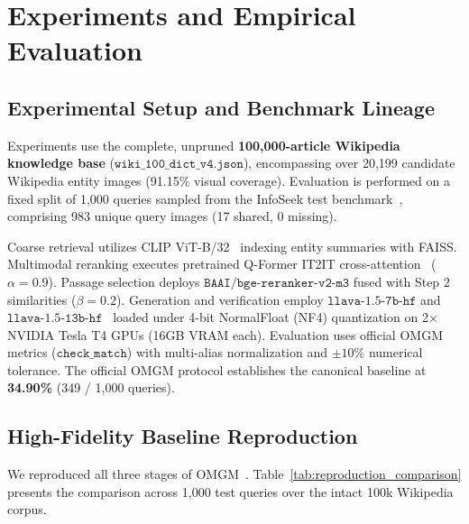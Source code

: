 \documentclass[conference]{IEEEtran}
\begin{document}
\section{Experiments and Empirical Evaluation}

\subsection{Experimental Setup and Benchmark Lineage}
Experiments use the complete, unpruned \textbf{100,000-article Wikipedia knowledge base} ($\mathtt{wiki\_100\_dict\_v4.json}$), encompassing over 20,199 candidate Wikipedia entity images (91.15\% visual coverage). Evaluation is performed on a fixed split of 1,000 queries sampled from the InfoSeek test benchmark~\cite{infoseek}, comprising 983 unique query images (17 shared, 0 missing).

Coarse retrieval utilizes CLIP ViT-B/32~\cite{clip} indexing entity summaries with FAISS. Multimodal reranking executes pretrained Q-Former IT2IT cross-attention~\cite{blip2, omgm2025} ($\alpha = 0.9$). Passage selection deploys $\mathtt{BAAI/bge\text{-}reranker\text{-}v2\text{-}m3}$ fused with Step 2 similarities ($\beta = 0.2$). Generation and verification employ $\mathtt{llava\text{-}1.5\text{-}7b\text{-}hf}$ and $\mathtt{llava\text{-}1.5\text{-}13b\text{-}hf}$~\cite{llava15} loaded under 4-bit NormalFloat (NF4) quantization on 2$\times$ NVIDIA Tesla T4 GPUs (16GB VRAM each). Evaluation uses official OMGM metrics ($\mathtt{check\_match}$) with multi-alias normalization and $\pm 10\%$ numerical tolerance. The official OMGM protocol establishes the canonical baseline at \textbf{34.90\%} (349 / 1,000 queries).

\subsection{High-Fidelity Baseline Reproduction}
We reproduced all three stages of OMGM~\cite{omgm2025}. Table~\ref{tab:reproduction_comparison} presents the comparison across 1,000 test queries over the intact 100k Wikipedia corpus.
\end{document}
